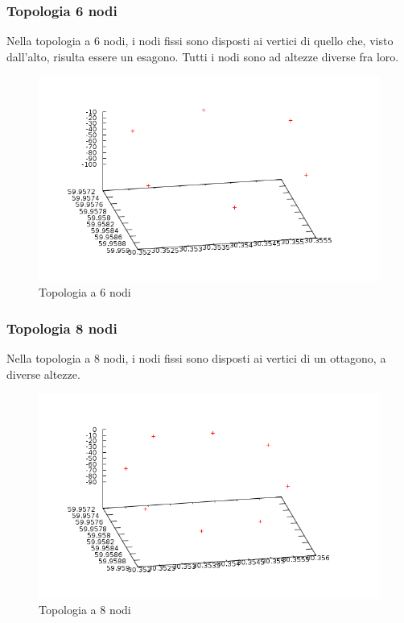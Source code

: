\documentclass[Lau,binding=0.6cm]{sapthesis}
\begin{document}
\subsubsection{Topologia 6 nodi}
Nella topologia a 6 nodi, i nodi fissi sono disposti ai vertici di quello che, visto dall'alto, risulta essere un esagono. Tutti i nodi sono ad altezze diverse fra loro.   
\begin{figure}[H]
    \centering
    \includegraphics[width=\linewidth]{topologyhexagon.png}
    \caption{Topologia a 6 nodi}
    \label{fig:my_label}
\end{figure}
\subsubsection{Topologia 8 nodi}
Nella topologia a 8 nodi, i nodi fissi sono disposti ai vertici di un ottagono, a diverse altezze.
\begin{figure}[H]
    \centering
    \includegraphics[width=\linewidth]{topologyoctagon.png}
    \caption{Topologia a 8 nodi}
    \label{fig:my_label}
\end{figure}
\end{document}

